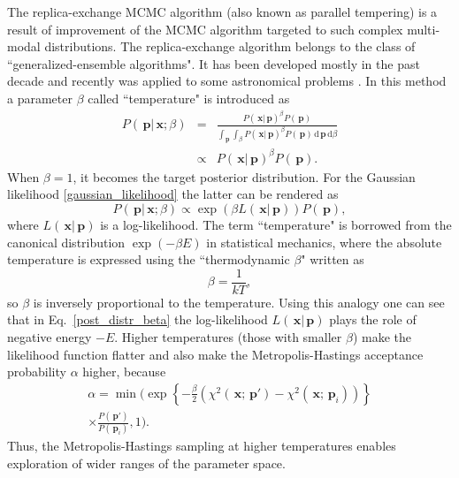 \documentclass[preprint2]{aastex}
\newcommand{\bfp}{\,\mathbf{p}}
\newcommand{\bfx}{\,\mathbf{x}}
\newcommand{\ud}{\,\mathrm{d}}
\begin{document}
The replica-exchange MCMC algorithm (also known as parallel tempering) is a result of improvement of the MCMC algorithm targeted to such complex multi-modal distributions. The replica-exchange algorithm belongs to the class of ``generalized-ensemble algorithms". It has been developed mostly in the past decade and recently was applied to some astronomical problems \citep{Gregory2005,Varghese_etal2011,Benneke_Seager2012}. In this method a parameter $\beta$ called ``temperature" is introduced as
\begin{eqnarray}
  \label{post_distr_beta}
  P(\bfp|\bfx;\beta) &=&  \frac{P(\bfx|\bfp)^\beta P(\bfp)}{\int_{\bfp} \int_{\beta} 
                              P(\bfx|\bfp)^\beta P(\bfp) \ud \bfp \ud \beta} \nonumber \\
      &\propto& P(\bfx|\bfp)^\beta P(\bfp)  .
\end{eqnarray}
When $\beta=1$, it becomes the target posterior distribution. For the Gaussian likelihood \eqref{gaussian_likelihood} the latter can be rendered as
\begin{equation}
      P(\bfp|\bfx;\beta) \propto \exp \left( \beta L(\bfx|\bfp) \right) P(\bfp),
\end{equation}
where $L(\bfx|\bfp)$ is a log-likelihood. The term ``temperature" is borrowed from the canonical distribution $\exp \left( -\beta E \right)$ in statistical mechanics, where the absolute temperature is expressed using the ``thermodynamic $\beta$" written as 
\begin{equation}
	\beta = \frac{1}{kT},
\end{equation}
so $\beta$ is inversely proportional to the temperature. Using this analogy one can see that in Eq.~\eqref{post_distr_beta}  the log-likelihood $L(\bfx|\bfp)$ plays the role of negative energy $-E$. Higher temperatures (those with smaller $\beta$) make the likelihood function flatter and also make the Metropolis-Hastings acceptance probability $\alpha$ higher, because
\begin{eqnarray}
  \label{accept_probab_beta}
  \alpha = \min \biggl( \exp \left\lbrace -\frac{\beta}{2}\left( \chi^2(\bfx;\bfp') - \chi^2(\bfx;\bfp_i) \right)
              \right\rbrace \nonumber \\
         \times  \frac{P(\bfp')} {P(\bfp_i)}, 1 \biggr).  
\end{eqnarray}
Thus, the Metropolis-Hastings sampling at higher temperatures enables exploration of wider ranges of the parameter space. 
\end{document}
